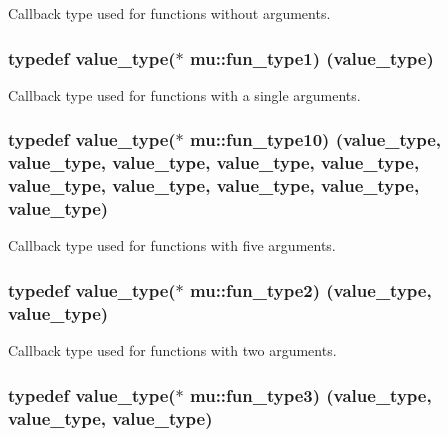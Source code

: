 Callback type used for functions without arguments. 

\subsubsection[{\texorpdfstring{fun\+\_\+type1}{fun_type1}}]{\setlength{\rightskip}{0pt plus 5cm}typedef {\bf value\+\_\+type}($\ast$ mu\+::fun\+\_\+type1) ({\bf value\+\_\+type})}\hypertarget{namespacemu_affeaec09801b502b9955d7248b7e2706}{}\label{namespacemu_affeaec09801b502b9955d7248b7e2706}


Callback type used for functions with a single arguments. 

\subsubsection[{\texorpdfstring{fun\+\_\+type10}{fun_type10}}]{\setlength{\rightskip}{0pt plus 5cm}typedef {\bf value\+\_\+type}($\ast$ mu\+::fun\+\_\+type10) ({\bf value\+\_\+type}, {\bf value\+\_\+type}, {\bf value\+\_\+type}, {\bf value\+\_\+type}, {\bf value\+\_\+type}, {\bf value\+\_\+type}, {\bf value\+\_\+type}, {\bf value\+\_\+type}, {\bf value\+\_\+type}, {\bf value\+\_\+type})}\hypertarget{namespacemu_a9d79a17c5171e8928f8c91964979e56c}{}\label{namespacemu_a9d79a17c5171e8928f8c91964979e56c}


Callback type used for functions with five arguments. 

\subsubsection[{\texorpdfstring{fun\+\_\+type2}{fun_type2}}]{\setlength{\rightskip}{0pt plus 5cm}typedef {\bf value\+\_\+type}($\ast$ mu\+::fun\+\_\+type2) ({\bf value\+\_\+type}, {\bf value\+\_\+type})}\hypertarget{namespacemu_abd9aed5816d33116d687f5becd85b38f}{}\label{namespacemu_abd9aed5816d33116d687f5becd85b38f}


Callback type used for functions with two arguments. 

\subsubsection[{\texorpdfstring{fun\+\_\+type3}{fun_type3}}]{\setlength{\rightskip}{0pt plus 5cm}typedef {\bf value\+\_\+type}($\ast$ mu\+::fun\+\_\+type3) ({\bf value\+\_\+type}, {\bf value\+\_\+type}, {\bf value\+\_\+type})}\hypertarget{namespacemu_ac89cbeb049bfe0ac38464d9420bf3201}{}\label{namespacemu_ac89cbeb049bfe0ac38464d9420bf3201}


